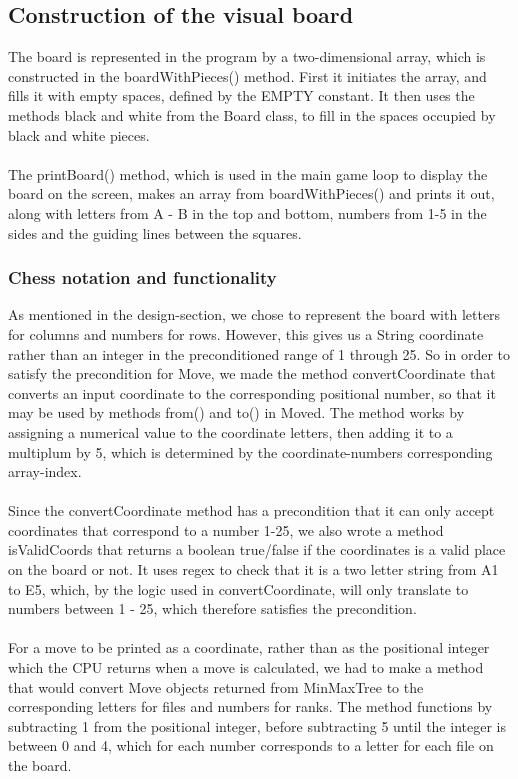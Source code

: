 \documentclass[12pt, a4paper]{article}
\begin{document}
	\subsection{Construction of the visual board}
	
	The board is represented in the program by a two-dimensional array, which is constructed in the boardWithPieces() method.
	First it initiates the array, and fills it with empty spaces, defined by the EMPTY constant.
	It then uses the methods black and white from the Board class, to fill in the spaces occupied by black and white pieces.
    \\\\
	The printBoard() method, which is used in the main game loop to display the board on the screen, makes an array from boardWithPieces() and prints it out, along with letters from A - B in the top and bottom, numbers from 1-5 in the sides and the guiding lines between the squares.
	
	\subsubsection{Chess notation and functionality}
	
	As mentioned in the design-section, we chose to represent the board with letters for columns and numbers for rows. However, this gives us a String coordinate rather than an integer in the preconditioned range of 1 through 25. So in order to satisfy the precondition for Move, we made the method convertCoordinate that converts an input coordinate to the corresponding positional number, so that it may be used by methods from() and to() in Moved.
	The method works by assigning a numerical value to the coordinate letters, then adding it to a multiplum by 5, which is determined by the coordinate-numbers corresponding array-index.
	\\\\
	Since the convertCoordinate method has a precondition that it can only accept coordinates that correspond to a number 1-25, we also wrote a method isValidCoords that returns a boolean true/false if the coordinates is a valid place on the board or not. It uses regex to check that it is a two letter string from A1 to E5, which, by the logic used in convertCoordinate, will only translate to numbers between 1 - 25, which therefore satisfies the precondition.
	\\\\
	For a move to be printed as a coordinate, rather than as the positional integer which the CPU returns when a move is calculated, we had to make a method that would convert Move objects returned from MinMaxTree to the corresponding letters for files and numbers for ranks. The method functions by subtracting 1 from the positional integer, before subtracting 5 until the integer is between 0 and 4, which for each number corresponds to a letter for each file on the board.
	
\end{document}
